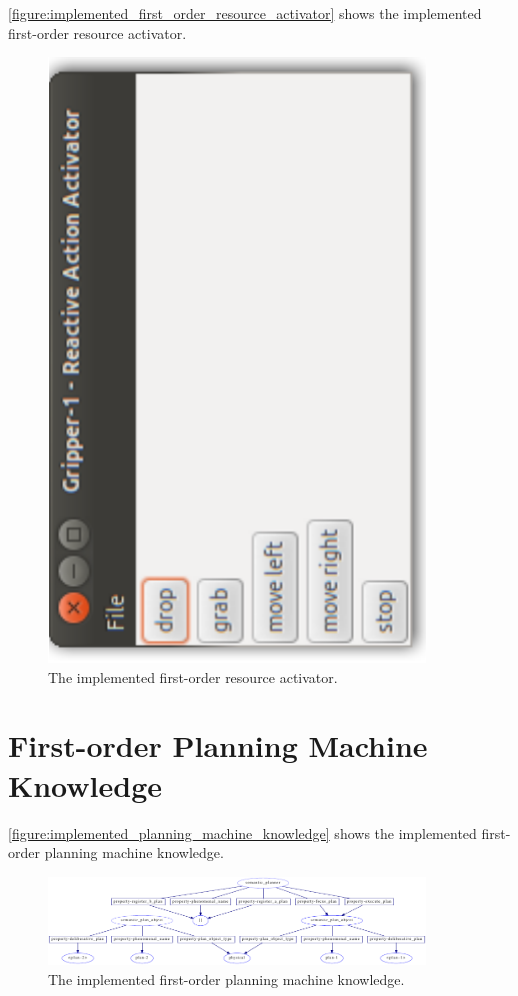 {\mbox{\autoref{figure:implemented_first_order_resource_activator}}}
shows the implemented first-order resource activator.
\begin{figure}
\includegraphics[width=10cm]{gfx/implemented_first_order_resource_activator}
\caption[The implemented first-order resource activator.]{The
  implemented first-order resource activator.}
\label{figure:implemented_first_order_resource_activator}
\end{figure}

\section{First-order Planning Machine Knowledge}

{\mbox{\autoref{figure:implemented_planning_machine_knowledge}}} shows
the implemented first-order planning machine knowledge.
\begin{figure}
\includegraphics[width=10cm]{gfx/implemented_planning_machine_knowledge}
\caption[The implemented first-order planning machine knowledge.]{The
  implemented first-order planning machine knowledge.}
\label{figure:implemented_first_order_planning_machine_knowledge}
\end{figure}

